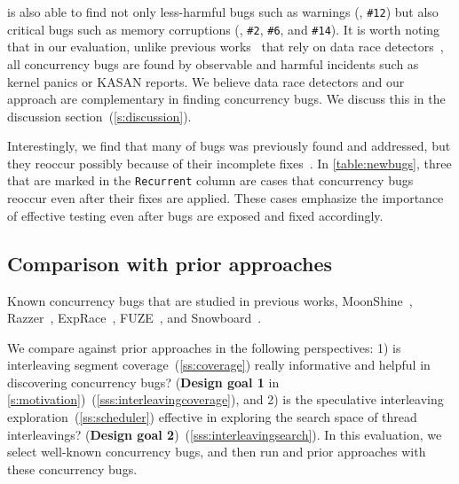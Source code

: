 \sys is also able to find not only less-harmful bugs such as warnings
(\eg, \texttt{\#12}) but also critical bugs such as memory corruptions
(\eg, \texttt{\#2}, \texttt{\#6}, and \texttt{\#14}).
%
It is worth noting that in our evaluation, unlike previous
works~\cite{snowboard, krace} that rely on data race
detectors~\cite{kcsan, tsan}, all concurrency bugs are found by
observable and harmful incidents such as kernel panics or KASAN
reports.
%
\dr{}
We believe data race detectors and our approach are complementary in
finding concurrency bugs. We discuss this in the discussion
section~(\autoref{s:discussion}).

Interestingly, we find that many of bugs was previously found and
addressed, but they reoccur possibly because of their incomplete
fixes~\cite{learningfrommistakes}.
%
In \autoref{table:newbugs}, three that are marked in the
\texttt{Recurrent} column are cases that concurrency bugs reoccur even
after their fixes are applied.
%
These cases emphasize the importance of effective testing even after
bugs are exposed and fixed accordingly.





\subsection{Comparison with prior approaches}
\label{ss:comparison}

\begin{table}[t]
  
  \centering
  \caption{Known concurrency bugs that are studied in previous works,
    MoonShine~\cite{moonshine}, Razzer~\cite{razzer},
    ExpRace~\cite{exprace}, FUZE~\cite{fuze}, and
    Snowboard~\cite{snowboard}.}
  \label{table:knownbugs}
\end{table}

We compare \sys against prior approaches in the following
perspectives: 1) is interleaving segment
coverage~(\autoref{ss:coverage}) really informative and helpful in
discovering concurrency bugs?  (\textbf{Design goal 1} in
\autoref{s:motivation})~(\autoref{sss:interleavingcoverage}), and
%
2) is the speculative interleaving
exploration~(\autoref{ss:scheduler}) effective in exploring the search
space of thread interleavings? (\textbf{Design goal
  2})~(\autoref{sss:interleavingsearch}).
%
In this evaluation, we select well-known concurrency bugs, and then
run \sys and prior approaches with these concurrency bugs.



